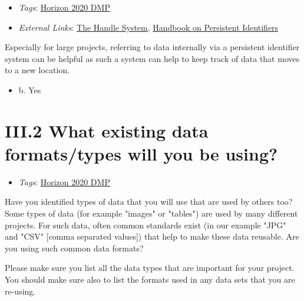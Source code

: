 \documentclass[a4paper,12pt]{report}
\begin{document}
\label{b1df3c74-0b1f-4574-81c4-4cc2d780c1af.8e886b55-3287-48e7-b353-daf6ab40f7d8.c05f27a2-30ac-44fd-9ac9-cd6f62b16d0c.b1f62b06-e69a-41be-8d16-1d73b9b75cd2}


\begin{itemize}
  \item \textit{Tags}: \ul{Horizon 2020 DMP}
  
  \item \textit{External Links}: \href{https://www.handle.net}{The Handle System}, \href{https://www.dpconline.org/handbook/technical-solutions-and-tools/persistent-identifiers}{Handbook on Persistent Identifiers}\end{itemize}


\noindent
\begin{markdown}
Especially for large projects, referring to data internally via a persistent identifier system can be helpful as such a system can help to keep track of data that moves to a new location.
\end{markdown}



\begin{itemize}
  \item[\CheckmarkBold] b. Yes
\end{itemize}






\section*{\protect\textcolor{colorSecId}{III.2} What existing data formats/types will you be using?}

\label{b1df3c74-0b1f-4574-81c4-4cc2d780c1af.b08fe063-33f8-4380-b3a9-ba1e586dedf2}


\begin{itemize}
  \item \textit{Tags}: \ul{Horizon 2020 DMP}
  \end{itemize}


\noindent
\begin{markdown}
Have you identified types of data that you will use that are used by others too? Some types of data (for example "images" or "tables") are used by many different projects. For such data, often common standards exist (in our example "JPG" and "CSV" [comma separated values]) that help to make these data reusable. Are you using such common data formats?

Please make sure you list all the data types that are important for your project. You should make sure also to list the formats used in any data sets that you are re-using.
\end{markdown}
\end{document}
